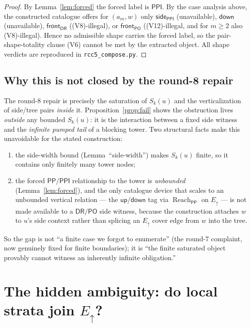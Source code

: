 \documentclass[11pt]{article}
\newcommand{\DR}{\mathsf{DR}}
\newcommand{\PO}{\mathsf{PO}}
\newcommand{\PP}{\mathsf{PP}}
\newcommand{\PPI}{\mathsf{PPI}}
\newcommand{\reach}{\operatorname{Reach}}
\newcommand{\Eup}{E_{\uparrow}}
\newcommand{\up}{\mathsf{up}}
\newcommand{\down}{\mathsf{down}}
\newcommand{\sidetag}{\mathsf{side}}
\newcommand{\fronttag}{\mathsf{front}}
\begin{document}
\begin{proof}
By Lemma~\ref{lem:forced} the forced label is $\PPI$.  By the case analysis
above, the constructed catalogue offers for $(a_m,w)$ only $\sidetag_{\PPI}$
(unavailable), $\down$ (unavailable), $\fronttag_{\DR}$ ((V8)-illegal), or
$\fronttag_{\PO}$ ((V12)-illegal, and for $m\ge2$ also (V8)-illegal).  Hence no
admissible shape carries the forced label, so the pair-shape-totality clause
(V6) cannot be met by the extracted object.  All shape verdicts are reproduced
in \texttt{rcc5\_compose.py}.
\end{proof}

\subsection{Why this is not closed by the round-8 repair}

The round-8 repair is precisely the saturation of $S_k(u)$ and the
verticalization of side/tree pairs \emph{inside} it.  Proposition~\ref{prop:fail}
shows the obstruction lives \emph{outside} any bounded $S_k(u)$: it is the
interaction between a fixed side witness and the \emph{infinite pumped tail} of a
blocking tower.  Two structural facts make this unavoidable for the stated
construction:
\begin{enumerate}[label=(\roman*)]
\item the side-width bound (Lemma~``side-width'') makes $S_k(u)$ finite, so it
contains only finitely many tower nodes;
\item the forced $\PP/\PPI$ relationship to the tower is \emph{unbounded}
(Lemma~\ref{lem:forced}), and the only catalogue device that scales to an
unbounded vertical relation --- the $\up/\down$ tag via $\reach_{\PP}$ on $\Eup$
--- is not made available to a $\DR/\PO$ side witness, because the construction
attaches $w$ to $u$'s side context rather than splicing an $\Eup$ cover edge from
$w$ into the tree.
\end{enumerate}
So the gap is not ``a finite case we forgot to enumerate'' (the round-7
complaint, now genuinely fixed for finite boundaries); it is ``the finite
saturated object provably cannot witness an inherently infinite obligation.''

\section{The hidden ambiguity: do local strata join \texorpdfstring{$\Eup$}{E-up}?}
\label{sec:ambiguity}
\end{document}
